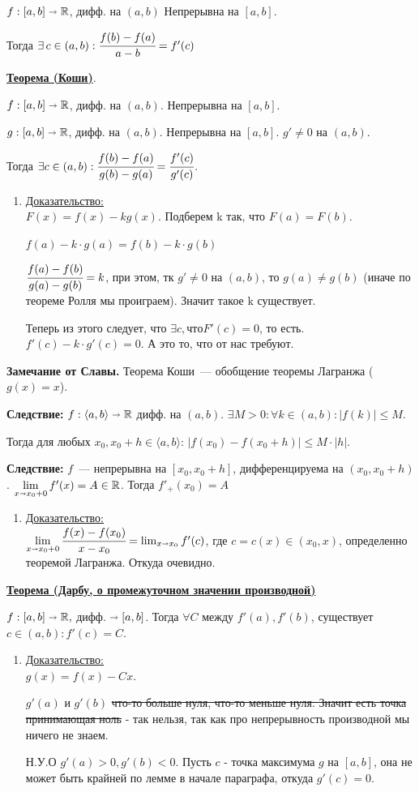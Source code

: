 \documentclass{article}
\newcommand{\thmm}[1]{\underline{\textbf{#1}}}
\newcommand{\prooff}[1]{{\underline{Доказательство:}} \\ }
\begin{document}
$f: [a,b] \shortrightarrow \mathbb{R}$, дифф. на $(a,b)$ Непрерывна на $[a,b]$. 

Тогда $\exists \, c \in (a,b): \cfrac{f(b)-f(a)}{a-b} = f'(c)$

\thmm{Теорема (Коши)}.

$f: [a,b] \shortrightarrow \mathbb{R}$, дифф. на $(a,b)$. Непрерывна на $[a,b]$.

$g: [a,b] \shortrightarrow \mathbb{R}$, дифф. на $(a,b)$. Непрерывна на $[a,b]$. $g'\neq 0$ на $(a,b)$.

Тогда $\exists c \in (a,b): \cfrac{f(b)-f(a)}{g(b)-g(a)} = \cfrac{f'(c)}{g'(c)}$.
\begin{enumerate}
    \item[] \prooff{}
    $F(x) = f(x) - k g(x)$. Подберем k так, что  $F(a) = F(b)$.

    $f(a) - k \cdot g(a) = f(b) - k \cdot g(b)$

    $\cfrac{f(a)-f(b)}{g(a) - g(b)} = k$, при этом, тк $g'\neq 0$ на $(a,b)$, то $g(a) \neq g(b)$ (иначе по теореме Ролля мы проиграем). Значит такое k существует.

    Теперь из этого следует, что $\exists c, что F'(c) = 0$, то есть. 
    $f'(c) -  k \cdot g'(c) = 0$. А это то, что от нас требуют.  
\end{enumerate}

\textbf{Замечание от Славы.} Теорема Коши~--- обобщение теоремы Лагранжа ($g(x) = x$).

\textbf{Следствие:} $f:\langle a,b\rangle \shortrightarrow \mathbb{R}$ дифф. на $(a,b)$. $\exists M>0: \forall k \in (a,b): |f(k)| \leq M$.

Тогда для любых $x_0, x_0 + h \in \langle a,b \rangle$: $|f(x_0)-f(x_0+h)|\leq M \cdot |h|$.

\textbf{Следствие:} $f$~--- непрерывна на $[x_0, x_0+h]$, дифференцируема на $(x_0, x_0+h)$. $\lim\limits_{x\shortrightarrow x_0  +0} f'(x) = A \in \mathbb{R}$.  Тогда $f'_{+}(x_0) = A$
\begin{enumerate}
    \item[] \prooff{}
    $\lim\limits_{x \shortrightarrow x_0 + 0} \cfrac{f(x)-f(x_0)}{x-x_0} = \lim_{x\shortrightarrow x_0} f'(c)$, где $c = c(x) \in (x_0,x)$, определенно теоремой Лагранжа.
    Откуда очевидно.
\end{enumerate}

\thmm{Теорема (Дарбу, о промежуточном значении производной)}

$f: [a,b] \shortrightarrow \mathbb{R},$ дифф. $\shortrightarrow [a,b]$. Тогда $\forall C$ между $f'(a),f'(b)$, существует $c \in (a,b): f'(c) = C$.
\begin{enumerate}
    \item[] \prooff{}
$g(x) = f(x) - Cx$.

$g'(a) $ и $g'(b)$ \sout{что-то больше нуля, что-то меньше нуля. Значит есть точка принимающая ноль} - так нельзя, так как про непрерывность производной мы ничего не знаем.

Н.У.О $g'(a)>0, g'(b)<0$. Пусть $ c$ - точка максимума $g$ на $[a,b]$, она не может быть крайней по лемме в начале параграфа, откуда $g'(c) = 0$.
\end{enumerate}
\end{document}
